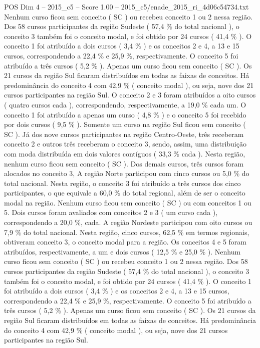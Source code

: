 \begin{textsample}{POS Dim 4 – 2015\_c5 – Score 1.00 – 2015\_c5/enade\_2015\_ri\_4d06c54734.txt}
Nenhum curso ficou sem conceito ( SC ) ou recebeu conceito 1 ou 2 nessa região.
Dos 58 cursos participantes da região Sudeste ( 57,4 \% do total nacional ), o conceito 3 também foi o conceito modal, e foi obtido por 24 cursos ( 41,4 \% ).
O conceito 1 foi atribuído a dois cursos ( 3,4 \% ) e os conceitos 2 e 4, a 13 e 15 cursos, correspondendo a 22,4 \% e 25,9 \%, respectivamente.
O conceito 5 foi atribuído a três cursos ( 5,2 \% ).
Apenas um curso ficou sem conceito ( SC ).
Os 21 cursos da região Sul ficaram distribuídos em todas as faixas de conceitos.
Há predominância do conceito 4 com 42,9 \% ( conceito modal ), ou seja, nove dos 21 cursos participantes na região Sul.
O conceito 2 e 3 foram atribuídos a oito cursos ( quatro cursos cada ), correspondendo, respectivamente, a 19,0 \% cada um.
O conceito 1 foi atribuído a apenas um curso ( 4,8 \% ) e o conceito 5 foi recebido por dois cursos ( 9,5 \% ).
Somente um curso na região Sul ficou sem conceito ( SC ).
Já dos nove cursos participantes na região Centro-Oeste, três receberam conceito 2 e outros três receberam o conceito 3, sendo, assim, uma distribuição com moda distribuída em dois valores contíguos ( 33,3 \% cada ).
Nesta região, nenhum curso ficou sem conceito ( SC ).
Dos demais cursos, três cursos foram alocados no conceito 3, A região Norte participou com cinco cursos ou 5,0 \% do total nacional.
Nesta região, o conceito 3 foi atribuído a três cursos dos cinco participantes, o que equivale a 60,0 \% do total regional, além de ser o conceito modal na região.
Nenhum curso ficou sem conceito ( SC ) ou com conceitos 1 ou 5.
Dois cursos foram avaliados com conceitos 2 e 3 ( um curso cada ), correspondendo a 20,0 \%, cada.
A região Nordeste participou com oito cursos ou 7,9 \% do total nacional.
Nesta região, cinco cursos, 62,5 \% em termos regionais, obtiveram conceito 3, o conceito modal para a região.
Os conceitos 4 e 5 foram atribuídos, respectivamente, a um e dois cursos ( 12,5 \% e 25,0 \% ).
Nenhum curso ficou sem conceito ( SC ) ou recebeu conceito 1 ou 2 nessa região.
Dos 58 cursos participantes da região Sudeste ( 57,4 \% do total nacional ), o conceito 3 também foi o conceito modal, e foi obtido por 24 cursos ( 41,4 \% ).
O conceito 1 foi atribuído a dois cursos ( 3,4 \% ) e os conceitos 2 e 4, a 13 e 15 cursos, correspondendo a 22,4 \% e 25,9 \%, respectivamente.
O conceito 5 foi atribuído a três cursos ( 5,2 \% ).
Apenas um curso ficou sem conceito ( SC ).
Os 21 cursos da região Sul ficaram distribuídos em todas as faixas de conceitos.
Há predominância do conceito 4 com 42,9 \% ( conceito modal ), ou seja, nove dos 21 cursos participantes na região Sul.

\end{textsample}
